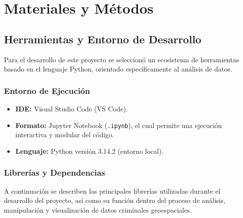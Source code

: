 \documentclass[12pt]{article}
\begin{document}
\section{Materiales y Métodos}
\subsection{Herramientas y Entorno de Desarrollo}

Para el desarrollo de este proyecto se seleccionó un ecosistema de herramientas basado en el lenguaje Python, orientado específicamente al análisis de datos.

\subsubsection{Entorno de Ejecución}
\begin{itemize}
    \item \textbf{IDE:} Visual Studio Code (VS Code).
    \item \textbf{Formato:} Jupyter Notebook (\texttt{.ipynb}), el cual permite una ejecución interactiva y modular del código.
    \item \textbf{Lenguaje:} Python versión 3.14.2 (entorno local).
\end{itemize}

\subsubsection{Librerías y Dependencias}

A continuación se describen las principales librerías utilizadas durante el desarrollo del proyecto, así como su función dentro del proceso de análisis, manipulación y visualización de datos criminales geoespaciales.
\end{document}

